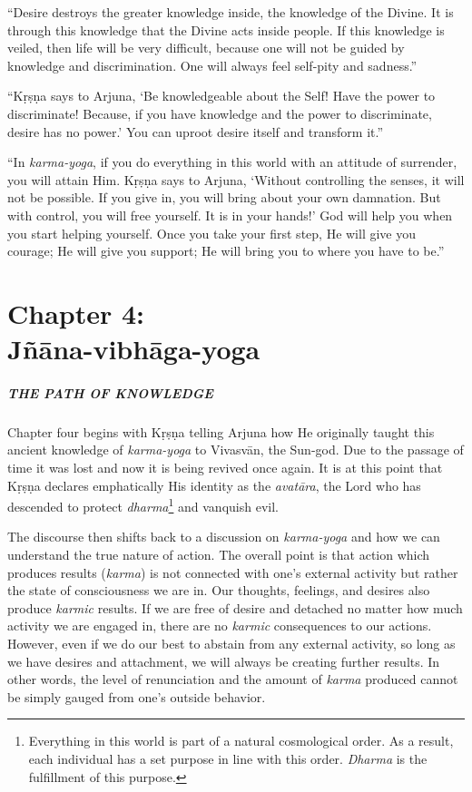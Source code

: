 \documentclass[12pt, twoside, openright]{memoir}
\begin{document}
\enquote{Desire destroys the greater knowledge inside, the knowledge of the Divine. It is through this knowledge that the Divine acts inside people. If this knowledge is veiled, then life will be very difficult, because one will not be guided by knowledge and discrimination. One will always feel self-pity and sadness.}

\enquote{Kṛṣṇa says to Arjuna, \enquote{Be knowledgeable about the Self! Have the power to discriminate! Because, if you have knowledge and the power to discriminate, desire has no power.} You can uproot desire itself and transform it.}

\enquote{In \textit{karma-yoga}, if you do everything in this world with an attitude of surrender, you will attain Him. Kṛṣṇa says to Arjuna, \enquote{Without controlling the senses, it will not be possible. If you give in, you will bring about your own damnation. But with control, you will free yourself. It is in your hands!} God will help you when you start helping yourself. Once you take your first step, He will give you courage; He will give you support; He will bring you to where you have to be.}

 \chapter{Chapter 4: \\Jñāna-vibhāga-yoga}\label{chap-jnana-vibhaga-yoga}

\paragraph*{\MakeUppercase{The Path of Knowledge}}


\noindent Chapter four begins with Kṛṣṇa telling Arjuna how He originally taught this ancient knowledge of \textit{karma-yoga} to Vivasvān, the Sun-god. Due to the passage of time it was lost and now it is being revived once again. It is at this point that Kṛṣṇa declares emphatically His identity as the \textit{avatāra}, the Lord who has descended to protect \textit{dharma}\footnote{Everything in this world is part of a natural cosmological order. As a result, each individual has a set purpose in line with this order. \textit{Dharma} is the fulfillment of this purpose.} and vanquish evil.

The discourse then shifts back to a discussion on \textit{karma-yoga} and how we can understand the true nature of action. The overall point is that action which produces results (\textit{karma}) is not connected with one’s external activity but rather the state of consciousness we are in. Our thoughts, feelings, and desires also produce \textit{karmic} results. If we are free of desire and detached no matter how much activity we are engaged in, there are no \textit{karmic} consequences to our actions. However, even if we do our best to abstain from any external activity, so long as we have desires and attachment, we will always be creating further results. In other words, the level of renunciation and the amount of \textit{karma} produced cannot be simply gauged from one’s outside behavior.
\end{document}
